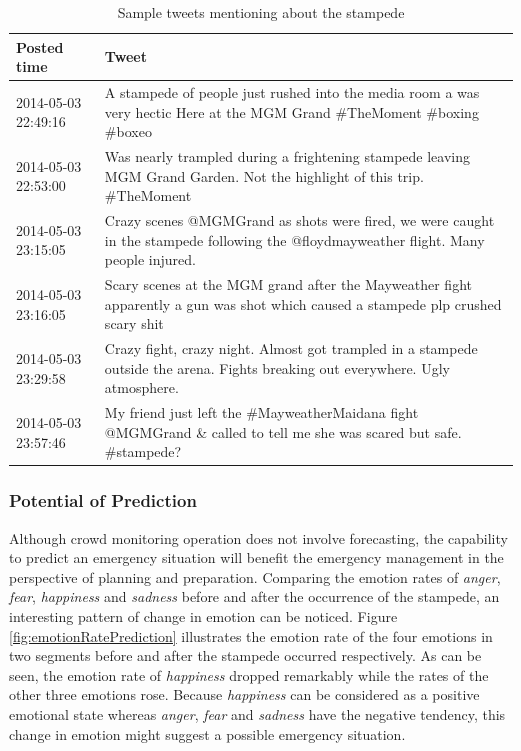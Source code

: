 \begin{table}[!htb]
\centering
\caption{Sample tweets mentioning about the stampede}
\label{table:tweetStampede}
\begin{tabular}{|p{2.5cm}|p{12cm}|}

\hline
\textbf{Posted time} & \textbf{Tweet} \\ \hline \hline
2014-05-03 22:49:16 & A stampede of people just rushed into the media room a was very hectic Here at the MGM Grand \#TheMoment \#boxing \#boxeo \\ \hline
2014-05-03 22:53:00 & Was nearly trampled during a frightening stampede leaving MGM Grand Garden. Not the highlight of this trip. \#TheMoment \\ \hline
2014-05-03 23:15:05 & Crazy scenes @MGMGrand as shots were fired, we were caught in the stampede following the @floydmayweather flight. Many people injured. \\ \hline
2014-05-03 23:16:05 & Scary scenes at the MGM grand after the Mayweather fight apparently a gun was shot which caused a stampede plp crushed scary shit \\ \hline
2014-05-03 23:29:58 & Crazy fight, crazy night. Almost got trampled in a stampede outside the arena. Fights breaking out everywhere. Ugly atmosphere. \\ \hline
2014-05-03 23:57:46 & My friend just left the \#MayweatherMaidana fight @MGMGrand \& called to tell me she was scared but safe. \#stampede? \\ \hline
\end{tabular}
\end{table}

\subsubsection{Potential of Prediction}
Although crowd monitoring operation does not involve forecasting, the capability to predict an emergency situation will benefit the emergency management in the perspective of planning and preparation. Comparing the emotion rates of \textit{anger}, \textit{fear}, \textit{happiness} and \textit{sadness} before and after the occurrence of the stampede, an interesting pattern of change in emotion can be noticed. Figure \ref{fig:emotionRatePrediction} illustrates the emotion rate of the four emotions in two segments before and after the stampede occurred respectively. As can be seen, the emotion rate of \textit{happiness} dropped remarkably while the rates of the other three emotions rose. Because \textit{happiness} can be considered as a positive emotional state whereas \textit{anger}, \textit{fear} and \textit{sadness} have the negative tendency, this change in emotion might suggest a possible emergency situation.

